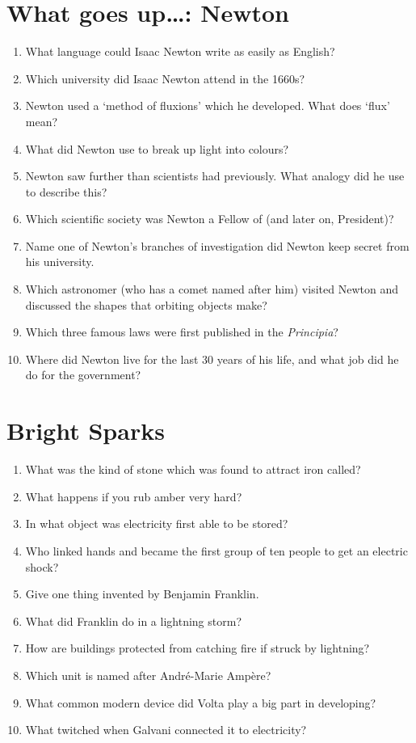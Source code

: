 \documentclass[a4paper,12pt]{article}
\begin{document}
\section{What goes up\ldots: Newton} %

\begin{enumerate}
\item What language could Isaac Newton write as easily as English?
\item Which university did Isaac Newton attend in the 1660s?
\item Newton used a `method of fluxions' which he developed.  What does `flux' mean?
\item What did Newton use to break up light into colours?
\item Newton saw further than scientists had previously.  What analogy did he use to describe this?
\item Which scientific society was Newton a Fellow of (and later on, President)?
\item Name one of Newton's branches of investigation did Newton keep secret from his university.
\item Which astronomer (who has a comet named after him) visited Newton and discussed the shapes that orbiting objects make?
\item Which three famous laws were first published in the \emph{Principia}?
\item Where did Newton live for the last 30 years of his life, and what job did he do for the government?
\end{enumerate}

\section{Bright Sparks} %

\begin{enumerate}
    \item What was the kind of stone which was found to attract iron called?
    \item What happens if you rub amber very hard?
    \item In what object was electricity first able to be stored?
    \item Who linked hands and became the first group of ten people to get an electric shock?
    \item Give one thing invented by Benjamin Franklin.
    \item What did Franklin do in a lightning storm?
    \item How are buildings protected from catching fire if struck by lightning?
    \item Which unit is named after Andr\'e-Marie Amp\`ere?
    \item What common modern device did Volta play a big part in developing?
    \item What twitched when Galvani connected it to electricity?
\end{enumerate}
\end{document}
